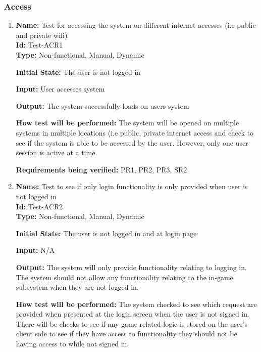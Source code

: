 \documentclass[12pt, titlepage]{article}
\begin{document}
\subsubsection{Access}
\begin{enumerate}
    \item{\textbf{Name:} Test for accessing the system on different internet accesses (i.e public and private wifi)\\} \label{Test-ACR1}
    \textbf{Id:} Test-ACR1\\
    
    \textbf{Type:} Non-functional, Manual, Dynamic
    					
    \textbf{Initial State:} The user is not logged in
    					
    \textbf{Input:} User accesses system
    					
    \textbf{Output:} The system successfully loads on users system
    					
    \textbf{How test will be performed:} The system will be opened on multiple systems in multiple locations (i.e public, private internet access and check to see if the system is able to be accessed by the user. However, only one user session is active at a time.
    
    \textbf{Requirements being verified:} PR1, PR2, PR3, SR2
    
    \item{\textbf{Name:} Test to see if only login functionality is only provided when user is not logged in\\} \label{Test-ACR2}
    \textbf{Id:} Test-ACR2\\
    
    \textbf{Type:} Non-functional, Manual, Dynamic
    					
    \textbf{Initial State:} The user is not logged in and at login page
    					
    \textbf{Input:} N/A
    					
    \textbf{Output:} The system will only provide functionality relating to logging in. The system should not allow any functionality relating to the in-game subsystem when they are not logged in.
    					
    \textbf{How test will be performed:} The system checked to see which request are provided when presented at the login screen when the user is not signed in. There will be checks to see if any game related logic is stored on the user's client side to see if they have access to functionality they should not be having access to while not signed in. 
    

\end{enumerate}
\end{document}

